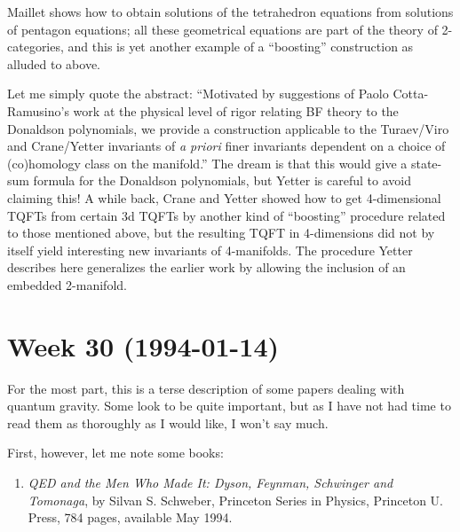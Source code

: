 \documentclass{article}
\def\tightlist{}
\renewcommand{\texttt}[1]{%
  \begingroup
  \ttfamily
  \begingroup\lccode`~=`/\lowercase{\endgroup\def~}{/\discretionary{}{}{}}%
  \begingroup\lccode`~=`[\lowercase{\endgroup\def~}{[\discretionary{}{}{}}%
  \begingroup\lccode`~=`.\lowercase{\endgroup\def~}{.\discretionary{}{}{}}%
  \catcode`/=\active\catcode`[=\active\catcode`.=\active
  \scantokens{#1\noexpand}%
  \endgroup
}
\begin{document}
Maillet shows how to obtain solutions of the tetrahedron equations from
solutions of pentagon equations; all these geometrical equations are
part of the theory of 2-categories, and this is yet another example of a
``boosting'' construction as alluded to above.


Let me simply quote the abstract: ``Motivated by suggestions of Paolo
Cotta-Ramusino's work at the physical level of rigor relating BF theory
to the Donaldson polynomials, we provide a construction applicable to
the Turaev/Viro and Crane/Yetter invariants of \emph{a priori} finer
invariants dependent on a choice of (co)homology class on the
manifold.'' The dream is that this would give a state-sum formula for
the Donaldson polynomials, but Yetter is careful to avoid claiming this!
A while back, Crane and Yetter showed how to get 4-dimensional TQFTs
from certain 3d TQFTs by another kind of ``boosting'' procedure related
to those mentioned above, but the resulting TQFT in 4-dimensions did not
by itself yield interesting new invariants of 4-manifolds. The procedure
Yetter describes here generalizes the earlier work by allowing the
inclusion of an embedded 2-manifold.
\hypertarget{week-30-1994-01-14}{%
\section{Week 30 (1994-01-14)}\label{week-30-1994-01-14}}

For the most part, this is a terse description of some papers dealing
with quantum gravity. Some look to be quite important, but as I have not
had time to read them as thoroughly as I would like, I won't say much.

First, however, let me note some books:

\begin{enumerate}
\def\labelenumi{\arabic{enumi})}
\tightlist
\item
  \emph{QED and the Men Who Made It: Dyson, Feynman, Schwinger and
  Tomonaga}, by Silvan S. Schweber, Princeton Series in Physics,
  Princeton U. Press, 784 pages, available May 1994.
\end{enumerate}
\end{document}

